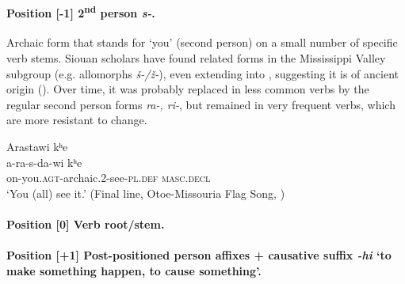 \documentclass[output=paper]{LSP/langsci}
\begin{document}
\noindent
\paragraph*{Position [-1]  2\textsuperscript{nd} person \textit{s-}.}

Archaic form that stands for `you' (second person) on a small number of specific verb stems.  Siouan scholars have found related forms in the Mississippi Valley subgroup (e.g.  allomorphs \textit{\v{s}-/\v{z}-}), even extending into , suggesting it is of ancient origin (\citealt[479-480]{Rankin2005b}).  Over time, it was probably replaced in less common verbs by the regular second person forms \textit{ra-, ri-}, but remained in very frequent verbs, which are more resistant to change.        

\let\eachwordtwo\itshape
\begin{exe}
\ex  
\glll Arastawi kʰe\\
 a-ra-s-da-wi  kʰe  \\
on-you.\textsc{agt}-archaic.2-see-\textsc{pl.def} \textsc{masc.decl} \\
\trans `You (all) see it.'  (Final line, Otoe-Missouria Flag Song, \citealt{Greer2008})     
\end{exe}     

\let\eachwordtwo\upshape					 
\paragraph*{Position [0]  Verb root/stem.}

\noindent
\paragraph*{Position [+1] Post-positioned person affixes + causative suffix  \textit{-hi} `to make something happen, to cause something'.}
\end{document}
